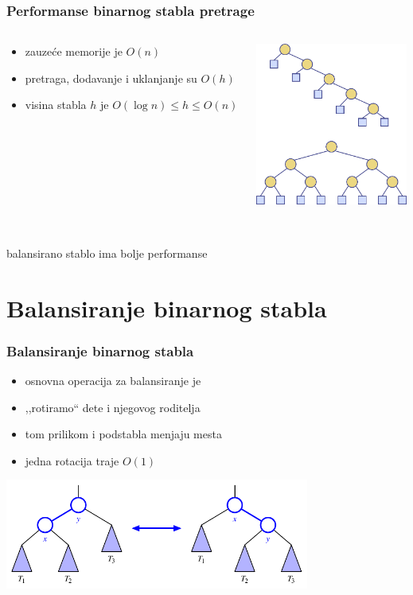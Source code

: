\documentclass[compress,aspectratio=169]{beamer}
\begin{document}
\begin{frame}[fragile]
  \frametitle{Performanse binarnog stabla pretrage}
  \begin{columns}
    \begin{column}[c]{6cm}
      \begin{itemize}
        \item zauzeće memorije je $O(n)$
        \item pretraga, dodavanje i uklanjanje su $O(h)$
        \item visina stabla $h$ je $O(\log n) \leq h \leq O(n)$
      \end{itemize}
    \end{column}  
    \begin{column}[c]{6cm}
      \begin{center}
        \includegraphics[width=5cm]{asp-11-pic08.png}
      \end{center}
    \end{column}  
  \end{columns}
  \ \\ \hfill balansirano stablo ima bolje performanse
\end{frame}

\section[Balansiranje]{Balansiranje binarnog stabla}
\begin{frame}[fragile]
  \frametitle{Balansiranje binarnog stabla}
  \begin{itemize}
    \item osnovna operacija za balansiranje je 
    \item ,,rotiramo`` dete i njegovog roditelja
    \item tom prilikom i podstabla menjaju mesta
    \item jedna rotacija traje $O(1)$
  \end{itemize}
  \begin{center}
    \includegraphics[width=10cm]{asp-11-pic09.pdf}
  \end{center}
\end{frame}
\end{document}
